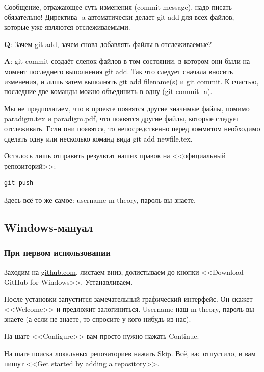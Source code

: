 \documentclass[11pt]{article}
\theoremstyle{remark}
\theoremstyle{definition}
\begin{document}
Сообщение, отражающее суть изменения (commit message), надо писать обязательно! Директива -a автоматически делает git add для всех файлов, которые уже являются отслеживаемыми.

\footnotesize{}

\textbf{Q}: Зачем git add, зачем снова добавлять файлы в отслеживаемые?

\textbf{A}: git commit создаёт слепок файлов в том состоянии, в котором они были на момент последнего выполнения git add. Так что следует сначала вносить изменения, и лишь затем выполнять git add filename(s) и git commit. К счастью, последние две команды можно объединить в одну (git commit -a).

\normalsize{}

Мы не предполагаем, что в проекте появятся другие значимые файлы, помимо paradigm.tex и paradigm.pdf, что появятся другие файлы, которые следует отслеживать. Если они появятся, то непосредственно перед коммитом необходимо сделать одну или несколько команд вида git add newfile.tex.

Осталось лишь отправить результат наших правок на <<официальный репозиторий>>:

\begin{verbatim}git push\end{verbatim}
Здесь всё то же самое: username m-theory, пароль вы знаете.




\subsection{Windows-мануал}


\subsubsection{При первом использовании}

Заходим на \href{https://github.com/}{\textcolor[rgb]{0.38,0.69,0.82}{github.com}}, листаем вниз, долистываем до кнопки <<Download GitHub for Windows>>. Устанавливаем.

После установки запустится замечательный графический интерфейс. Он скажет <<Welcome>> и предложит залогиниться. Username наш m-theory, пароль вы знаете (а если не знаете, то спросите у кого-нибудь из нас).

На шаге <<Configure>> вам просто нужно нажать Continue.

На шаге поиска локальных репозиториев нажать Skip. Всё, вас отпустило, и вам пишут <<Get started by adding a repository>>.
\end{document}
